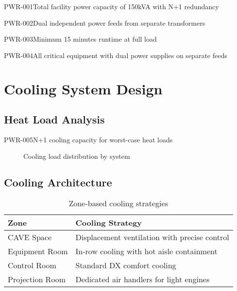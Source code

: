 \begin{requirement}{PWR-001}{Total facility power capacity of 150kVA with N+1 redundancy}
\begin{requirement}{PWR-002}{Dual independent power feeds from separate transformers}
\begin{requirement}{PWR-003}{Minimum 15 minutes runtime at full load}
\begin{requirement}{PWR-004}{All critical equipment with dual power supplies on separate feeds}
\section{Cooling System Design}

\subsection{Heat Load Analysis}

\begin{requirement}{PWR-005}{N+1 cooling capacity for worst-case heat loads}

\begin{figure}[H]
\centering
\pgfplotsset{width=10cm, height=6cm}
\caption{Cooling load distribution by system}
\end{figure}

\subsection{Cooling Architecture}

\begin{table}[H]
\centering
\begin{tabularx}{\textwidth}{@{}lX@{}}
\toprule
\textbf{Zone} & \textbf{Cooling Strategy} \\
\midrule
CAVE Space & Displacement ventilation with precise control \\
Equipment Room & In-row cooling with hot aisle containment \\
Control Room & Standard DX comfort cooling \\
Projection Room & Dedicated air handlers for light engines \\
\bottomrule
\end{tabularx}
\caption{Zone-based cooling strategies}
\end{table}


\end{requirement}
\end{requirement}
\end{requirement}
\end{requirement}
\end{requirement}
